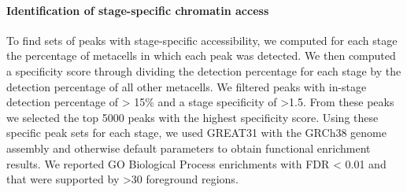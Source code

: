 \paragraph{Identification of stage-specific chromatin access}
To find sets of peaks with stage-specific accessibility, we computed for each stage the percentage of metacells in which each peak was detected. We then computed a specificity score through dividing the detection percentage for each stage by the detection percentage of all other metacells. We filtered peaks with in-stage detection percentage of > 15\% and a stage specificity of >1.5. From these peaks we selected the top 5000 peaks with the highest specificity score. Using these specific peak sets for each stage, we used GREAT31 with the GRCh38 genome assembly and otherwise default parameters to obtain functional enrichment results. We reported GO Biological Process enrichments with FDR < 0.01 and that were supported by >30 foreground regions.
 
 
